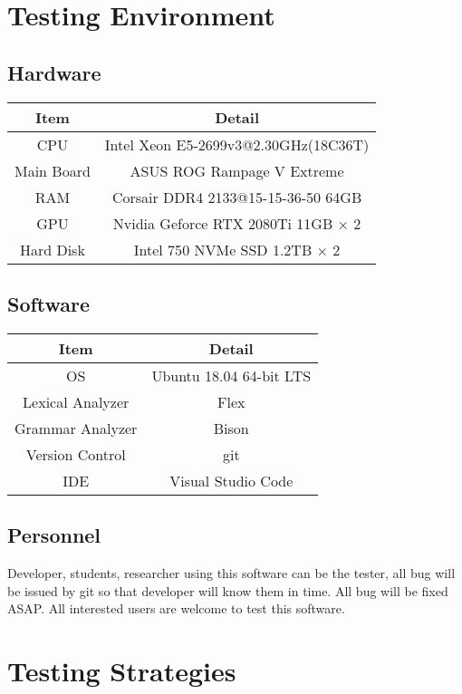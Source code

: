 \documentclass{article}
\begin{document}
	\section{Testing Environment}
	\subsection{Hardware}
	\begin{center}
			\begin{tabular}{cc}
			\toprule
			Item & Detail \\
			\midrule
			CPU & Intel Xeon E5-2699v3@2.30GHz(18C36T) \\
			Main Board & ASUS ROG Rampage V Extreme \\
			RAM & Corsair DDR4 2133@15-15-36-50 64GB \\
			GPU & Nvidia Geforce RTX 2080Ti 11GB $ \times $ 2 \\
			Hard Disk & Intel 750 NVMe SSD 1.2TB $ \times $ 2 \\
			\bottomrule
			\end{tabular}
			\end{center}
	\subsection{Software}
	\begin{center}
			\begin{tabular}{cc}
			\toprule
			Item & Detail \\
			\midrule
			OS & Ubuntu 18.04 64-bit LTS\\
			Lexical Analyzer & Flex\\
			Grammar Analyzer & Bison\\
			Version Control & git\\
			IDE & Visual Studio Code\\
			\bottomrule
			\end{tabular}
			\end{center}
	\subsection{Personnel}
	Developer, students, researcher using this software can be the tester, all bug will be issued by git so that developer will know them in time. All bug will be fixed ASAP. All interested users are welcome to test this software.
	\section{Testing Strategies}
\end{document}
